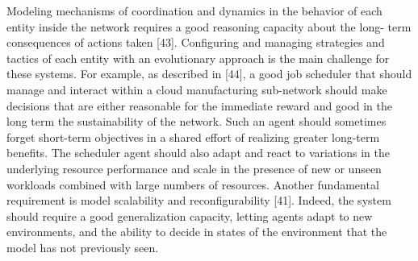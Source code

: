 Modeling mechanisms of coordination and dynamics in the behavior of each entity inside the network requires a good reasoning capacity about the long- term consequences of actions taken [43]. Configuring and managing strategies and tactics of each entity with an evolutionary approach is the main challenge for these systems. For example, as described in [44], a good job scheduler that should manage and interact within a cloud manufacturing sub-network should make decisions that are either reasonable for the immediate reward and good in the long term the sustainability of the network. Such an agent should sometimes forget short-term objectives in a shared effort of realizing greater long-term benefits. The scheduler agent should also adapt and react to variations in the underlying resource performance and scale in the presence of new or unseen workloads combined with large numbers of resources. Another fundamental requirement is model scalability and reconfigurability [41]. Indeed, the system should require a good generalization capacity, letting agents adapt to new environments, and the ability to decide in states of the environment that the model has not previously seen.
